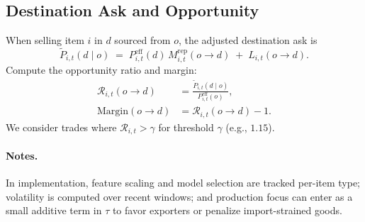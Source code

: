 \documentclass{article}
\begin{document}
\subsection*{Destination Ask and Opportunity}
When selling item $i$ in $d$ sourced from $o$, the adjusted destination ask is
\begin{equation}
\tilde P_{i,t}(d \mid o) \;=\; P^{\mathrm{eff}}_{i,t}(d)\,M^{\mathrm{rep}}_{i,t}(o\!\to\! d) \;+\; L_{i,t}(o\!\to\! d).
\end{equation}
Compute the opportunity ratio and margin:
\begin{align}
\mathcal{R}_{i,t}(o\!\to\! d) &= \frac{\tilde P_{i,t}(d \mid o)}{P^{\mathrm{eff}}_{i,t}(o)}, \\
\mathrm{Margin}(o\!\to\! d) &= \mathcal{R}_{i,t}(o\!\to\! d) - 1.
\end{align}
We consider trades where $\mathcal{R}_{i,t} > \gamma$ for threshold $\gamma$ (e.g., $1.15$).

\paragraph{Notes.} In implementation, feature scaling and model selection are tracked per-item type; volatility is computed over recent windows; and production focus can enter as a small additive term in $\tau$ to favor exporters or penalize import-strained goods.
\end{document}
